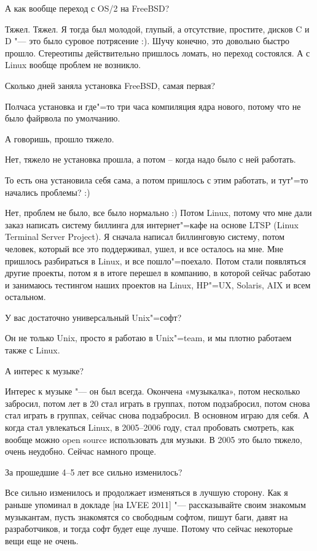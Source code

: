\documentclass[10pt, a5paper]{article}
\begin{document}
\q А как вообще переход с OS/2 на FreeBSD?

\a Тяжел. Тяжел. Я тогда был молодой, глупый, а отсутствие, простите, дисков C и D "--- это было суровое потрясение :). Шучу конечно, это довольно быстро прошло. Стереотипы действительно пришлось ломать, но переход состоялся. А с Linux вообще проблем не возникло.

\q Сколько дней заняла установка FreeBSD, самая первая?

\a Полчаса установка и где"=то три часа компиляция ядра нового, потому что не было файрвола по умолчанию. 

\q А говоришь, прошло тяжело.

\a Нет, тяжело не установка прошла, а потом – когда надо было с ней работать.

\q То есть она установила себя сама, а потом пришлось с этим работать, и тут"=то начались проблемы? :)

\a Нет, проблем не было, все было нормально :) Потом Linux, потому что мне дали заказ написать систему биллинга для интернет"=кафе на основе LTSP (Linux Terminal Server Project). Я сначала написал биллинговую систему, потом человек, который все это поддерживал, ушел, и все осталось на мне. Мне пришлось разбираться в Linux, и все пошло"=поехало. Потом стали появляться другие проекты, потом я в итоге перешел в компанию, в которой сейчас работаю и занимаюсь тестингом наших проектов на Linux, HP"=UX, Solaris, AIX и всем остальном.

\q У вас достаточно универсальный Unix"=софт?

\a Он не только Unix, просто я работаю в Unix"=team, и мы плотно работаем также с Linux.

\q А интерес к музыке?

\a Интерес к музыке "--- он был всегда. Окончена «музыкалка», потом несколько забросил, потом лет в 20 стал играть в группах, потом подзабросил, потом снова стал играть в группах, сейчас снова подзабросил. В основном играю для себя. А когда стал увлекаться Linux, в 2005--2006 году, стал пробовать смотреть, как вообще можно open source использовать для музыки. В 2005 это было тяжело, очень неудобно. Сейчас намного проще. 

\q За прошедшие 4--5 лет все сильно изменилось?

\a Все сильно изменилось и продолжает изменяться в лучшую сторону. Как я раньше упоминал в докладе [на LVEE 2011] "--- рассказывайте своим знакомым музыкантам, пусть знакомятся со свободным софтом, пишут баги, давят на разработчиков, и тогда софт будет еще лучше. Потому что сейчас некоторые вещи еще не очень.
\end{document}
